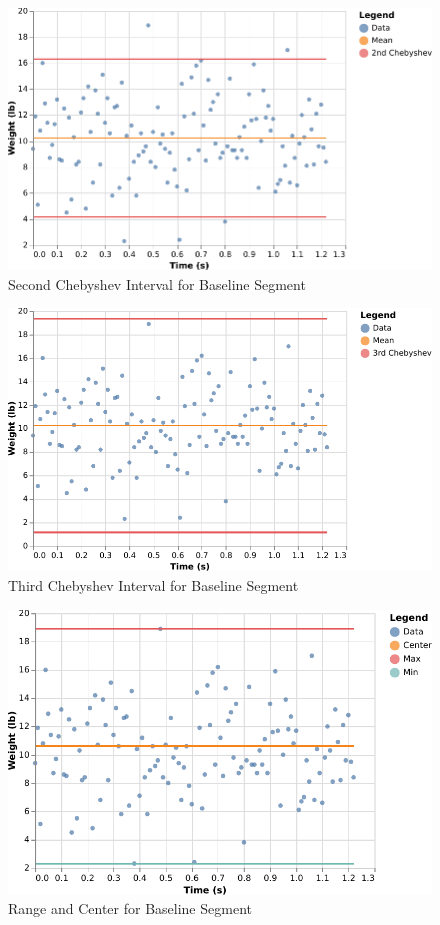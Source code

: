 %
\begin{figure}[ht]
    \centering
    \includegraphics{chart/00-intro/baseline-chebyshev-2.pdf}
    \caption{Second Chebyshev Interval for Baseline Segment}
    \label{figure:00.baseline.chebyshev.2}
\end{figure}
%
\begin{figure}[ht]
    \centering
    \includegraphics{chart/00-intro/baseline-chebyshev-3.pdf}
    \caption{Third Chebyshev Interval for Baseline Segment}
    \label{figure:00.baseline.chebyshev.3}
\end{figure}
%
\begin{figure}[ht]
    \centering
    \includegraphics{chart/00-intro/baseline-min-center-max.pdf}
    \caption{Range and Center for Baseline Segment}
    \label{figure:00.baseline.center}
\end{figure}
